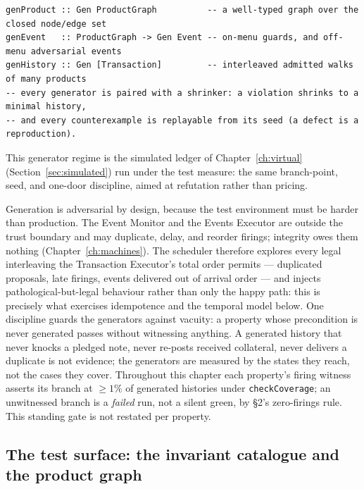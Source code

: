 \documentclass[11pt,a4paper]{article}
\begin{document}
\begin{lstlisting}
genProduct :: Gen ProductGraph          -- a well-typed graph over the closed node/edge set
genEvent   :: ProductGraph -> Gen Event -- on-menu guards, and off-menu adversarial events
genHistory :: Gen [Transaction]         -- interleaved admitted walks of many products
-- every generator is paired with a shrinker: a violation shrinks to a minimal history,
-- and every counterexample is replayable from its seed (a defect is a reproduction).
\end{lstlisting}

This generator regime is the simulated ledger of Chapter~\ref{ch:virtual}
(Section~\ref{sec:simulated}) run under the test measure: the same branch-point,
seed, and one-door discipline, aimed at refutation rather than pricing.

Generation is adversarial by design, because the test environment must be harder than
production. The Event Monitor and the Events Executor are outside the trust boundary and may
duplicate, delay, and reorder firings; integrity owes them nothing
(Chapter~\ref{ch:machines}). The scheduler therefore explores every legal interleaving the
Transaction Executor's total order permits --- duplicated proposals, late firings, events
delivered out of arrival order --- and injects pathological-but-legal behaviour rather than
only the happy path: this is precisely what exercises idempotence and the temporal model
below. One discipline guards the generators against vacuity: a property whose precondition
is never generated passes without witnessing anything. A generated history that never knocks
a pledged note, never re-posts received collateral, never delivers a duplicate is not
evidence; the generators are measured by the states they reach, not the cases they cover.
Throughout this chapter each property's firing witness asserts its branch at $\ge 1\%$ of
generated histories under \texttt{checkCoverage}; an unwitnessed branch is a \emph{failed}
run, not a silent green, by \S 2's zero-firings rule. This standing gate is not restated per
property.

\subsection{The test surface: the invariant catalogue and the product graph}
\end{document}
